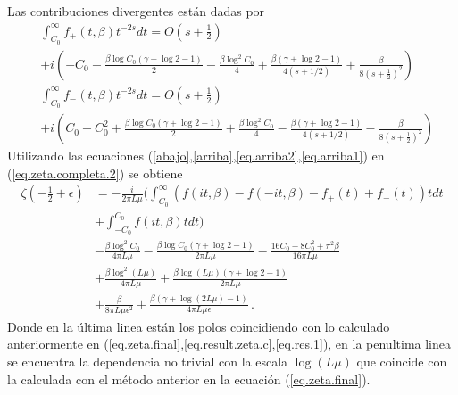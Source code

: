 Las contribuciones divergentes están dadas por
\begin{align}
\label{arriba}
&
	\int _{C _0} ^{\infty}
			f _{+} (t, \beta )			
			 t ^{-2s} dt =  
	O \left( s + \frac{1}{2} \right)
\\[5pt]
\nonumber			
&+
	i \left(- C _0 
		    - \frac{\beta \log C_0 (\gamma + \log 2 - 1 ) 
		    		}{2} 
		    - \frac{\beta \log ^2 C _0}{4}
		    + \frac{\beta ( \gamma + \log 2 -1 )}{4 (s + 1/2)} 
		    + \frac{\beta}{8 (s + \frac{1}{2}) ^2}
					\right)
\\[5pt]
\label{abajo}
&
	\int _{C _0} ^{\infty}
			f _{-} ( t, \beta)
			 t ^{-2s} dt =
	O \left(s + \frac{1}{2} \right)
\\[5pt]
\nonumber
&+
	i \left(C _0 
			- C _0 ^2
		    + \frac{\beta \log C_0 (\gamma + \log 2 - 1 ) 
		    		}{2} 
		    + \frac{\beta \log ^2 C _0}{4}
		    - \frac{\beta ( \gamma + \log 2 -1 )}{4 (s + 1/2)} 
		    - \frac{\beta}{8 (s + \frac{1}{2}) ^2}
					\right)
\end{align}
Utilizando las ecuaciones (\ref{abajo},\ref{arriba},\ref{eq.arriba2},\ref{eq.arriba1}) en (\ref{eq.zeta.completa.2}) se obtiene
\begin{align}
\zeta \left( - \frac{1}{2}  + \epsilon \right) &=
- \frac{i}{2 \pi L \mu} 
\Bigg(	  
		 \int _{C _0} ^{\infty}
			\left(
					f (i t,\beta )
					- f (-i t,\beta )
					- f _{+} (t) 
					+ f _{-} (t)
					\right)
			t   dt   \nonumber
\\ \nonumber
&+
		 \int _{- C _0} ^{C _0}
			f (i t,\beta )
			t   dt 	
	\Bigg)
\\ \nonumber
&
	- \frac{\beta \log ^2 C _0}{4 \pi L \mu}
	- \frac{\beta \log C _0 (\gamma + \log 2 -1 )}{2 \pi L \mu} 
	- \frac{16 C_0 - 8 C _0 ^2 + \pi ^2 \beta}{16 \pi L \mu}
\\ \nonumber
&
	+\frac{\beta \log ^2 (L \mu )}{4 \pi L \mu} 
	+ \frac{\beta \log  (L \mu) (\gamma + \log 2 -1)}{2 \pi L \mu}
\\ 
&	+ \frac{\beta}
		 {8 \pi L \mu  \epsilon ^2} +
	\frac{\beta (\gamma + \log (2 L \mu) -1 ) }
		 {4 \pi L \mu  \epsilon } 
\, .
\end{align}
Donde en la última linea están los polos coincidiendo con lo calculado anteriormente en (\ref{eq.zeta.final},\ref{eq.result.zeta.c},\ref{eq.res.1}), en la penultima linea se encuentra la dependencia no trivial con la escala $\log (L \mu)$ que coincide con la calculada con el método anterior en la ecuación (\ref{eq.zeta.final}).

